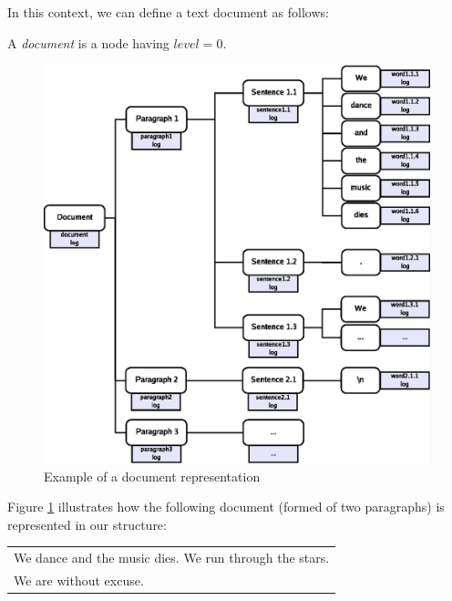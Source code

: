 In this context, we can define a text document as follows:

\begin{defi}
A \emph{document} is a node having $level=0$.
\end{defi}

\begin{figure}[htp]
\begin{center}
\includegraphics{img/treeex.eps}
\end{center}
\caption{Example of a document representation}
\label{fig:treeex}
\end{figure}

Figure \ref{fig:treeex} illustrates how the following document (formed of two paragraphs)
is represented in our structure:

\begin{center}
\begin{tabular}[c]{|l|}
\hline
We dance and the music dies.
We run through the stars.\\
We are without excuse.\\
\hline
\end{tabular}
\end{center}

